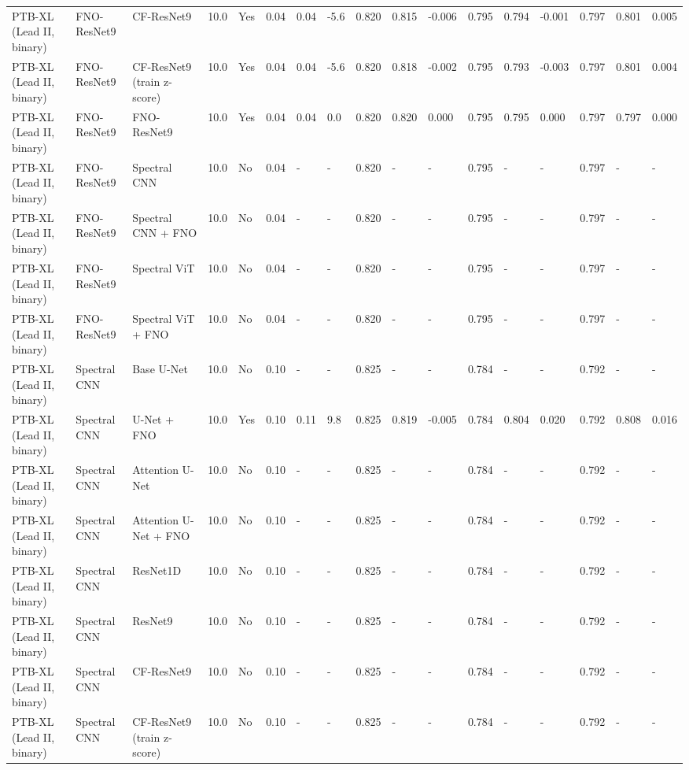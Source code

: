 \begin{longtable}{lllllllllllllllll}
PTB-XL (Lead II, binary) & FNO-ResNet9 & CF-ResNet9 & 10.0 & Yes & 0.04 & 0.04 & -5.6 & 0.820 & 0.815 & -0.006 & 0.795 & 0.794 & -0.001 & 0.797 & 0.801 & 0.005 \\
PTB-XL (Lead II, binary) & FNO-ResNet9 & CF-ResNet9 (train z-score) & 10.0 & Yes & 0.04 & 0.04 & -5.6 & 0.820 & 0.818 & -0.002 & 0.795 & 0.793 & -0.003 & 0.797 & 0.801 & 0.004 \\
PTB-XL (Lead II, binary) & FNO-ResNet9 & FNO-ResNet9 & 10.0 & Yes & 0.04 & 0.04 & 0.0 & 0.820 & 0.820 & 0.000 & 0.795 & 0.795 & 0.000 & 0.797 & 0.797 & 0.000 \\
PTB-XL (Lead II, binary) & FNO-ResNet9 & Spectral CNN & 10.0 & No & 0.04 & - & - & 0.820 & - & - & 0.795 & - & - & 0.797 & - & - \\
PTB-XL (Lead II, binary) & FNO-ResNet9 & Spectral CNN + FNO & 10.0 & No & 0.04 & - & - & 0.820 & - & - & 0.795 & - & - & 0.797 & - & - \\
PTB-XL (Lead II, binary) & FNO-ResNet9 & Spectral ViT & 10.0 & No & 0.04 & - & - & 0.820 & - & - & 0.795 & - & - & 0.797 & - & - \\
PTB-XL (Lead II, binary) & FNO-ResNet9 & Spectral ViT + FNO & 10.0 & No & 0.04 & - & - & 0.820 & - & - & 0.795 & - & - & 0.797 & - & - \\
PTB-XL (Lead II, binary) & Spectral CNN & Base U-Net & 10.0 & No & 0.10 & - & - & 0.825 & - & - & 0.784 & - & - & 0.792 & - & - \\
PTB-XL (Lead II, binary) & Spectral CNN & U-Net + FNO & 10.0 & Yes & 0.10 & 0.11 & 9.8 & 0.825 & 0.819 & -0.005 & 0.784 & 0.804 & 0.020 & 0.792 & 0.808 & 0.016 \\
PTB-XL (Lead II, binary) & Spectral CNN & Attention U-Net & 10.0 & No & 0.10 & - & - & 0.825 & - & - & 0.784 & - & - & 0.792 & - & - \\
PTB-XL (Lead II, binary) & Spectral CNN & Attention U-Net + FNO & 10.0 & No & 0.10 & - & - & 0.825 & - & - & 0.784 & - & - & 0.792 & - & - \\
PTB-XL (Lead II, binary) & Spectral CNN & ResNet1D & 10.0 & No & 0.10 & - & - & 0.825 & - & - & 0.784 & - & - & 0.792 & - & - \\
PTB-XL (Lead II, binary) & Spectral CNN & ResNet9 & 10.0 & No & 0.10 & - & - & 0.825 & - & - & 0.784 & - & - & 0.792 & - & - \\
PTB-XL (Lead II, binary) & Spectral CNN & CF-ResNet9 & 10.0 & No & 0.10 & - & - & 0.825 & - & - & 0.784 & - & - & 0.792 & - & - \\
PTB-XL (Lead II, binary) & Spectral CNN & CF-ResNet9 (train z-score) & 10.0 & No & 0.10 & - & - & 0.825 & - & - & 0.784 & - & - & 0.792 & - & - \\

\end{longtable}
